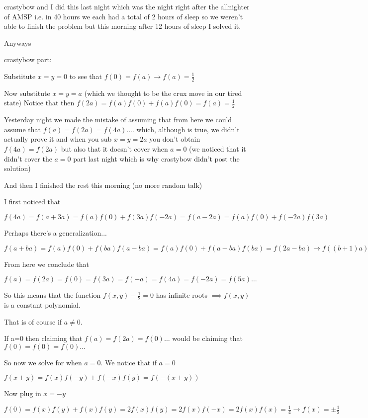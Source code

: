 \begin{mysolution}
	crastybow and I did this last night which was the night right after the allnighter of AMSP i.e. in 40 hours we each had a total of 2 hours of sleep so we weren't able to finish the problem but this morning after 12 hours of sleep I solved it.

Anyways 

crastybow part:

Substitute $x=y=0$ to see that $f(0) = f(a) \rightarrow f(a) = \frac{1}{2}$

Now substitute $x=y=a$ (which we thought to be the crux move in our tired state) Notice that then $f(2a) = f(a)f(0) + f(a)f(0) = f(a) = \frac{1}{2}$

Yesterday night we made the mistake of assuming that from here we could assume that $f(a) = f(2a) = f(4a) ....$ which, although is true, we didn't actually prove it and when you sub $x=y=2a$ you don't obtain $f(4a) = f(2a)$ but also that it doesn't cover when $a=0$ (we noticed that it didn't cover the $a=0$ part last night which is why crastybow didn't post the solution) 

And then I finished the rest this morning (no more random talk) 

I first noticed that 

$f(4a) = f(a+3a) = f(a)f(0) + f(3a)f(-2a) = f(a-2a) = f(a)f(0) + f(-2a)f(3a)$

Perhaps there's a generalization...

$f(a+ba) = f(a)f(0) + f(ba)f(a-ba) = f(a)f(0) + f(a-ba)f(ba) = f(2a-ba) \rightarrow f((b+1)a) = f((2-b)a)$ 

From here we conclude that 

$f(a) = f(2a) = f(0) = f(3a) = f(-a) = f(4a) = f(-2a) = f(5a) \ldots$ 

So this means that the function $f(x,y) - \frac{1}{2} = 0$ has infinite roots $\implies f(x,y)$ is a constant polynomial.

That is of course if $a \ne 0$. 

If a=0 then claiming that $f(a) = f(2a) = f(0) \ldots$ would be claiming that $f(0) = f(0) = f(0) \ldots$ 

So now we solve for when $a=0$. We notice that if $a = 0$

$f(x+y) = f(x)f(-y)+f(-x)f(y) = f(-(x+y))$ 

Now plug in $x=-y$

$f(0) = f(x)f(y) + f(x)f(y) = 2f(x)f(y) = 2f(x)f(-x) = 2f(x)f(x) = \frac{1}{4} \rightarrow f(x) = \pm \frac{1}{2}$


\end{mysolution}
